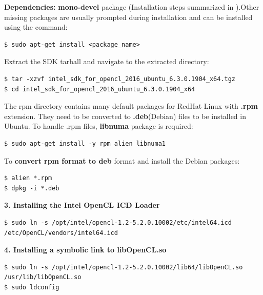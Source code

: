 \textbf{Dependencies:}\newline \newline
\textbf{mono-devel} package (Installation steps summarized in \cite{mono-devel}).\newline Other missing packages are usually prompted during installation and can be installed using the command: 
\begin{scriptsize}
\linuxbash
\begin{lstlisting}
$ sudo apt-get install <package_name>
\end{lstlisting}
\end{scriptsize}
Extract the SDK tarball and navigate to the extracted directory:
\begin{scriptsize}
\linuxbash
\begin{lstlisting} 
$ tar -xzvf intel_sdk_for_opencl_2016_ubuntu_6.3.0.1904_x64.tgz
$ cd intel_sdk_for_opencl_2016_ubuntu_6.3.0.1904_x64
\end{lstlisting}
\end{scriptsize}
The rpm directory contains many default packages for RedHat Linux with \textbf{.rpm} extension. They need to be converted to \textbf{.deb}(Debian) files to be installed in Ubuntu. To handle .rpm files, \textbf{libnuma} package is required:
\begin{scriptsize}
\linuxbash
\begin{lstlisting} 
$ sudo apt-get install -y rpm alien libnuma1
\end{lstlisting}
\end{scriptsize}
To \textbf{convert rpm format to deb} format and install the Debian packages: 
\begin{scriptsize}
\linuxbash
\begin{lstlisting}        
$ alien *.rpm
$ dpkg -i *.deb 
\end{lstlisting}
\end{scriptsize}
\textbf{3. Installing the Intel OpenCL ICD Loader}
\begin{scriptsize}
\linuxbash
\begin{lstlisting}
$ sudo ln -s /opt/intel/opencl-1.2-5.2.0.10002/etc/intel64.icd /etc/OpenCL/vendors/intel64.icd
\end{lstlisting}
\end{scriptsize}
\textbf{4. Installing a symbolic link to libOpenCL.so} 
\begin{scriptsize}
\linuxbash
\begin{lstlisting}
$ sudo ln -s /opt/intel/opencl-1.2-5.2.0.10002/lib64/libOpenCL.so /usr/lib/libOpenCL.so 
$ sudo ldconfig
\end{lstlisting}
\end{scriptsize}
